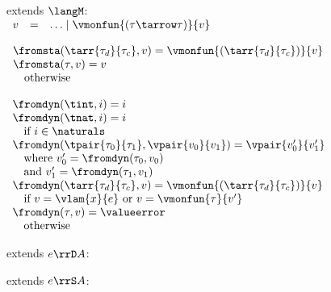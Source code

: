 \begin{flushleft}

\begin{minipage}[t]{0.5\textwidth}
 extends $\langM$:\\
$\begin{array}{l c l}
  v & = & \ldots \mid \vmonfun{(\tau\tarrow\tau)}{v}
\end{array}$

\medskip
$\begin{array}{l}
  \fromsta(\tarr{\tau_d}{\tau_c}, v) = \vmonfun{(\tarr{\tau_d}{\tau_c})}{v}
\\
  \fromsta(\tau, v) = v
\\ \mbox{\quad otherwise}
\end{array}$
\end{minipage}%
\begin{minipage}[t]{0.5\textwidth}
$\begin{array}{l}
  \fromdyn(\tint, i) = i
\\
  \fromdyn(\tnat, i) = i
\\ \mbox{\quad if $i \in \naturals$}
\\
  \fromdyn(\tpair{\tau_0}{\tau_1}, \vpair{v_0}{v_1}) = \vpair{v_0'}{v_1'}
\\ \mbox{\quad where $v_0' = \fromdyn(\tau_0, v_0)$}
\\ \mbox{\quad and $v_1' = \fromdyn(\tau_1, v_1)$}
\\
  \fromdyn(\tarr{\tau_d}{\tau_c}, v) = \vmonfun{(\tarr{\tau_d}{\tau_c})}{v}
\\ \mbox{\quad if $v = \vlam{x}{e}$ or $v = \vmonfun{\tau}{v'}$}
\\
  \fromdyn(\tau, v) = \valueerror
\\ \mbox{\quad otherwise}
\end{array}$
\end{minipage}

\medskip
\begin{minipage}[t]{0.5\textwidth}
 extends $e \rrD A$:
\begin{mathpar}
\end{mathpar}
\end{minipage}%
\begin{minipage}[t]{0.5\textwidth}
 extends $e \rrS A$:
\begin{mathpar}
\end{mathpar}
\end{minipage}%


\end{flushleft}
